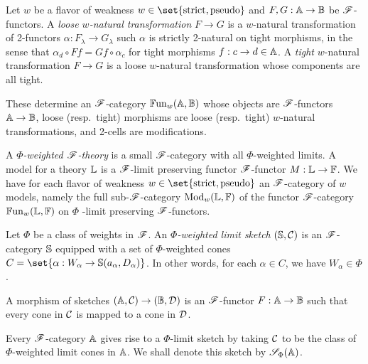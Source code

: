 \documentclass[../thesis.tex]{subfiles}
\begin{document}
\begin{definition}
  Let $w$ be a flavor of weakness $w \in \set{\text{strict},\text{pseudo}}$ and $F, G : {\mathbb{A}} \to {\mathbb{B}}$
  be ${\mathscr{F}}$-functors. A \emph{loose $w$-natural transformation} $F \to G$ is a $w$-natural transformation
  of 2-functors $\alpha : F_\lambda \to G_\lambda$ such $\alpha$ is strictly 2-natural on tight morphisms,
  in the sense that $\alpha_d \circ F f = G f \circ \alpha_c$ for tight morphisms $f : c \to d \in {\mathbb{A}}$. 
  A \emph{tight} $w$-natural transformation $F \to G$ is a loose $w$-natural transformation whose components
  are all tight.

  These determine an ${\mathscr{F}}$-category ${\mathbb{F}\mathrm{un}}_w({\mathbb{A}},{\mathbb{B}})$ whose objects are ${\mathscr{F}}$-functors ${\mathbb{A}} \to
  {\mathbb{B}}$, loose (resp.\ tight) morphisms are loose (resp.\ tight) $w$-natural transformations,
  and 2-cells are modifications. 
\end{definition}

\begin{definition}[Logic]
  A \emph{$\Phi$-weighted ${\mathscr{F}}$-theory} is a small ${\mathscr{F}}$-category with all $\Phi$-weighted limits. A model
  for a theory ${\mathbb{L}}$ is a ${\mathscr{F}}$-limit preserving functor ${\mathscr{F}}$-functor $M : {\mathbb{L}} \to {\mathbb{F}}$. We have for each
  flavor  of weakness $w \in \set{\text{strict}, \text{pseudo}}$ an ${\mathscr{F}}$-category of $w$ models, namely
  the full sub-${\mathscr{F}}$-category ${\mathrm{Mod}}_w({\mathbb{L}}, {\mathbb{F}})$ of the functor ${\mathscr{F}}$-category ${\mathbb{F}\mathrm{un}}_w({\mathbb{L}},{\mathbb{F}})$ on $\Phi$%
  -limit preserving ${\mathscr{F}}$-functors.
\end{definition}

\begin{definition}
  Let $\Phi$ be a class of weights in ${\mathscr{F}}$. An \emph{$\Phi$-weighted limit sketch} $({\mathbb{S}},{\mathcal{C}})$ is an
  ${\mathscr{F}}$-category ${\mathbb{S}}$ equipped with a set of $\Phi$-weighted cones $C = \set{\alpha : W_\alpha \to \bS(
  a_\alpha,D_\alpha)}$. In other words, for each $\alpha \in C$, we have $W_\alpha \in \Phi$.

  A morphism of sketches $({\mathbb{A}},{\mathcal{C}}) \to ({\mathbb{B}}, {\mathcal{D}})$ is an ${\mathscr{F}}$-functor $F : {\mathbb{A}} \to {\mathbb{B}}$ such that every
  cone in ${\mathcal{C}}$ is mapped to a cone in ${\mathcal{D}}$.
\end{definition}

Every ${\mathscr{F}}$-category ${\mathbb{A}}$ gives rise to a $\Phi$-limit sketch by taking ${\mathcal{C}}$ to be the class of
$\Phi$-weighted limit cones in ${\mathbb{A}}$. We shall denote this sketch by ${\mathscr{S}}_\Phi({\mathbb{A}})$.
\end{document}
